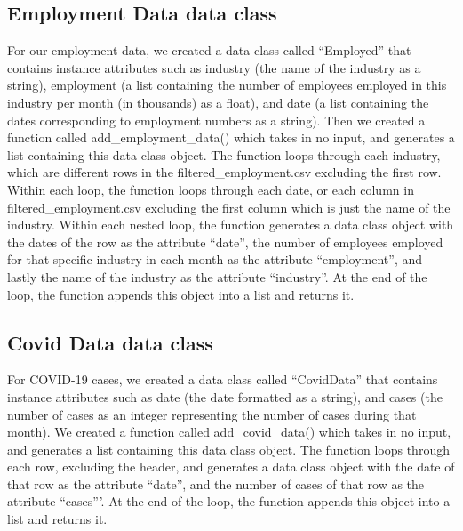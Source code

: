 \documentclass[fontsize=11pt]{article}
\begin{document}

\subsection{Employment Data data class}

For our employment data, we created a data class called ``Employed” that contains instance attributes such as industry (the name of the industry as a string), employment (a list containing the number of employees employed in this industry per month (in thousands) as a float), and date (a list containing the dates corresponding to employment numbers as a string). Then we created a function called add\_employment\_data() which takes in no input, and generates a list containing this data class object. The function loops through each industry, which are different rows in the filtered\_employment.csv excluding the first row. Within each loop, the function loops through each date, or each column in filtered\_employment.csv excluding the first column which is just the name of the industry. Within each nested loop, the function generates a data class object with the dates of the row as the attribute ``date”, the number of employees employed for that specific industry in each month as the attribute ``employment”, and lastly the name of the industry as the attribute ``industry”. At the end of the loop, the function appends this object into a list and returns it.

\subsection{Covid Data data class}

For COVID-19 cases, we created a data class called ``CovidData” that contains instance attributes such as date (the date formatted as a string), and cases (the number of cases as an integer representing the number of cases during that month). We created a function called add\_covid\_data() which takes in no input, and generates a list containing this data class object. The function loops through each row, excluding the header, and generates a data class object with the date of that row as the attribute ``date”, and the number of cases of that row as the attribute ``cases”’. At the end of the loop, the function appends this object into a list and returns it.
\end{document}
